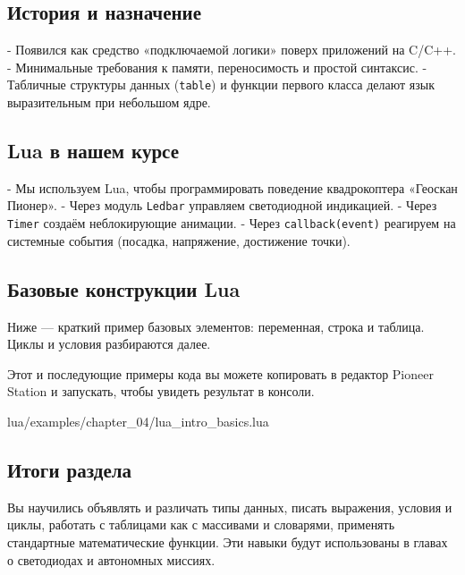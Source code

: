 \subsection{История и назначение}
- Появился как средство «подключаемой логики» поверх приложений на C/C++.
- Минимальные требования к памяти, переносимость и простой синтаксис.
- Табличные структуры данных (\verb|table|) и функции первого класса делают язык выразительным при небольшом ядре.

\subsection{Lua в нашем курсе}
- Мы используем Lua, чтобы программировать поведение квадрокоптера «Геоскан Пионер».
- Через модуль \verb|Ledbar| управляем светодиодной индикацией.
- Через \verb|Timer| создаём неблокирующие анимации.
- Через \verb|callback(event)| реагируем на системные события (посадка, напряжение, достижение точки).

\subsection{Базовые конструкции Lua}
Ниже — краткий пример базовых элементов: переменная, строка и таблица. Циклы и условия разбираются далее.
\begin{infobox}[Практика]
    Этот и последующие примеры кода вы можете копировать в редактор Pioneer Station и запускать, чтобы увидеть результат в консоли.
\end{infobox}
\begin{codefile}{lua/examples/chapter_04/lua_intro_basics.lua}
\end{codefile}
\subsection*{Итоги раздела}
Вы научились объявлять и различать типы данных, писать выражения, условия и циклы, работать с таблицами как с массивами и словарями, применять стандартные математические функции. Эти навыки будут использованы в главах о светодиодах и автономных миссиях.
